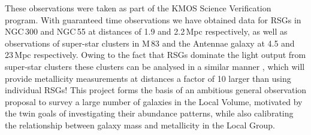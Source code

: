 \documentclass[manuscript]{aastex}
\begin{document}
These observations were taken as part of the KMOS Science Verification program.
With guaranteed time observations we have obtained data for RSGs in NGC\,300 and NGC\,55 at distances of 1.9 and 2.2\,Mpc respectively,
as well as observations of super-star clusters in M\,83 and the Antennae galaxy at 4.5 and 23\,Mpc respectively.
Owing to the fact that RSGs dominate the light output from super-star clusters
\citep{2013MNRAS.430L..35G} these clusters can be analysed in a similar manner
\cite{2014ApJ...787..142G},
which will provide metallicity measurements at distances a factor of 10 larger than using individual RSGs!
This project forms the basis of an ambitious general observation proposal to survey a large number of galaxies in the Local Volume,
motivated by the twin goals of investigating their abundance patterns,
while also calibrating the relationship between galaxy mass and metallicity in the Local Group.




\end{document}
